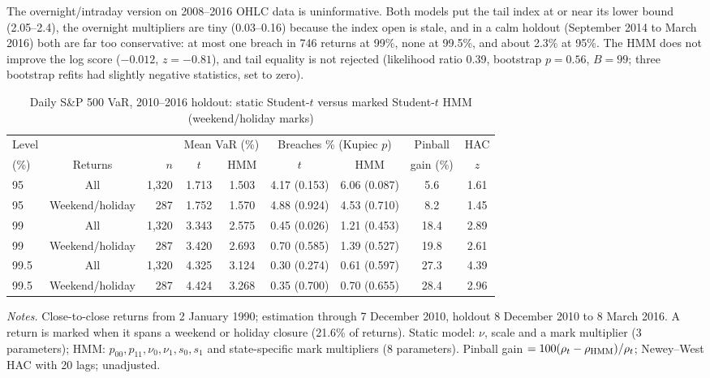 \documentclass[11pt,a4paper]{article}
\theoremstyle{plain}
\theoremstyle{remark}
\begin{document}
The overnight/intraday version on 2008--2016 OHLC data is uninformative. Both models put the tail index at or near its lower bound (2.05--2.4), the overnight multipliers are tiny (0.03--0.16) because the index open is stale, and in a calm holdout (September 2014 to March 2016) both are far too conservative: at most one breach in 746 returns at 99\%, none at 99.5\%, and about 2.3\% at 95\%. The HMM does not improve the log score ($-0.012$, $z=-0.81$), and tail equality is not rejected (likelihood ratio 0.39, bootstrap $p=0.56$, $B=99$; three bootstrap refits had slightly negative statistics, set to zero).

\begin{table}[ht]
\centering\small
\caption{Daily S\&P 500 VaR, 2010--2016 holdout: static Student-$t$ versus marked Student-$t$ HMM (weekend/holiday marks)}\label{tab:dailyB}
\begin{tabular}{lcrcccccc}
\toprule
Level & & & \multicolumn{2}{c}{Mean VaR (\%)} & \multicolumn{2}{c}{Breaches \% (Kupiec $p$)} & Pinball & HAC\\
(\%) & Returns & $n$ & $t$ & HMM & $t$ & HMM & gain (\%) & $z$\\
\midrule
95 & All & 1{,}320 & 1.713 & 1.503 & 4.17 (0.153) & 6.06 (0.087) & 5.6 & 1.61\\
95 & Weekend/holiday & 287 & 1.752 & 1.570 & 4.88 (0.924) & 4.53 (0.710) & 8.2 & 1.45\\
99 & All & 1{,}320 & 3.343 & 2.575 & 0.45 (0.026) & 1.21 (0.453) & 18.4 & 2.89\\
99 & Weekend/holiday & 287 & 3.420 & 2.693 & 0.70 (0.585) & 1.39 (0.527) & 19.8 & 2.61\\
99.5 & All & 1{,}320 & 4.325 & 3.124 & 0.30 (0.274) & 0.61 (0.597) & 27.3 & 4.39\\
99.5 & Weekend/holiday & 287 & 4.424 & 3.268 & 0.35 (0.700) & 0.70 (0.655) & 28.4 & 2.96\\
\bottomrule
\end{tabular}
\par\smallskip\footnotesize\emph{Notes.} Close-to-close returns from 2 January 1990; estimation through 7 December 2010, holdout 8 December 2010 to 8 March 2016. A return is marked when it spans a weekend or holiday closure (21.6\% of returns). Static model: $\nu$, scale and a mark multiplier (3 parameters); HMM: $p_{00},p_{11},\nu_0,\nu_1,s_0,s_1$ and state-specific mark multipliers (8 parameters). Pinball gain $=100(\rho_t-\rho_{\rm HMM})/\rho_t$; Newey--West HAC with 20 lags; unadjusted.
\end{table}
\end{document}
